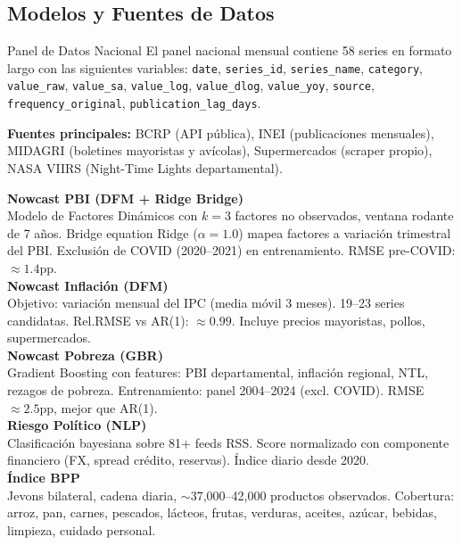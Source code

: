 \documentclass[10pt,a4paper]{article}
\begin{document}
\vspace{0.8em}

\subsection{Modelos y Fuentes de Datos}

\begin{sectionbox}{Panel de Datos Nacional}
  \small\color{ink}
  El panel nacional mensual contiene 58 series en formato largo con las siguientes variables:
  \texttt{date}, \texttt{series\_id}, \texttt{series\_name}, \texttt{category},
  \texttt{value\_raw}, \texttt{value\_sa}, \texttt{value\_log}, \texttt{value\_dlog},
  \texttt{value\_yoy}, \texttt{source}, \texttt{frequency\_original}, \texttt{publication\_lag\_days}.

  \vspace{4pt}
  \textbf{Fuentes principales:} BCRP (API pública), INEI (publicaciones mensuales),
  MIDAGRI (boletines mayoristas y avícolas), Supermercados (scraper propio),
  NASA VIIRS (Night-Time Lights departamental).
\end{sectionbox}

\vspace{0.6em}

\begin{tcolorbox}[
  enhanced,
  colback=white,
  colframe=border,
  boxrule=0.5pt,
  arc=3pt,
  left=10pt, right=10pt, top=8pt, bottom=8pt,
]
  \small\color{ink}
  \textbf{Nowcast PBI (DFM + Ridge Bridge)}\\
  Modelo de Factores Dinámicos con $k=3$ factores no observados, ventana rodante de 7 años.
  Bridge equation Ridge ($\alpha=1.0$) mapea factores a variación trimestral del PBI.
  Exclusión de COVID (2020--2021) en entrenamiento. RMSE pre-COVID: $\approx 1.4$pp.\\[8pt]

  \textbf{Nowcast Inflación (DFM)}\\
  Objetivo: variación mensual del IPC (media móvil 3 meses). 19--23 series candidatas.
  Rel.RMSE vs AR(1): $\approx 0.99$. Incluye precios mayoristas, pollos, supermercados.\\[8pt]

  \textbf{Nowcast Pobreza (GBR)}\\
  Gradient Boosting con features: PBI departamental, inflación regional, NTL, rezagos de pobreza.
  Entrenamiento: panel 2004--2024 (excl. COVID). RMSE $\approx 2.5$pp, mejor que AR(1).\\[8pt]

  \textbf{Riesgo Político (NLP)}\\
  Clasificación bayesiana sobre 81+ feeds RSS. Score normalizado con componente financiero
  (FX, spread crédito, reservas). Índice diario desde 2020.\\[8pt]

  \textbf{Índice BPP}\\
  Jevons bilateral, cadena diaria, $\sim$37,000--42,000 productos observados.
  Cobertura: arroz, pan, carnes, pescados, lácteos, frutas, verduras, aceites,
  azúcar, bebidas, limpieza, cuidado personal.
\end{tcolorbox}
\end{document}
